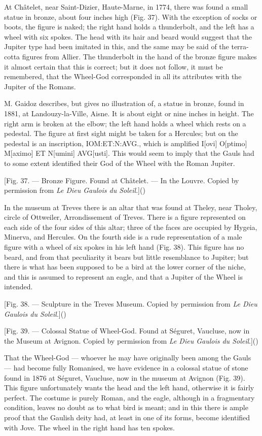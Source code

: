 \documentclass[a4paper, 11pt, oneside, polutonikogreek, english]{article}
\begin{document}
At Châtelet, near Saint-Dizier, Haute-Marne, in 1774, there was found a small statue in bronze, about four inches high (Fig. 37). With the exception of socks or boots, the figure is naked; the right hand holds a thunderbolt, and the left has a wheel with six spokes. The head with its hair and beard would suggest that the Jupiter type had been imitated in this, and the same may be said of the terra-cotta figures from Allier. The thunderbolt in the hand of the bronze figure makes it almost certain that this is correct; but it does not follow, it must be remembered, that the Wheel-God corresponded in all its attributes with the Jupiter of the Romans.

M. Gaidoz describes, but gives no illustration of, a statue in bronze, found in 1881, at Landouzy-la-Ville, Aisne. It is about eight or nine inches in height. The right arm is broken at the elbow; the left hand holds a wheel which rests on a pedestal. The figure at first sight might be taken for a Hercules; but on the pedestal is an inscription, IOM:ET:N:AVG., which is amplified I[ovi] O[ptimo] M[aximo] ET N[umini] AVG[usti]. This would seem to imply that the Gauls had to some extent identified their God of the Wheel with the Roman Jupiter.

[Fig. 37. --- Bronze Figure. Found at Châtelet. --- In the Louvre. Copied by permission from \emph{Le Dieu Gaulois du Soleil}.]()

In the museum at Treves there is an altar that was found at Theley, near Tholey, circle of Ottweiler, Arrondissement of Treves. There is a figure represented on each side of the four sides of this altar; three of the faces are occupied by Hygeia, Minerva, and Hercules. On the fourth side is a rude representation of a male figure with a wheel of six spokes in his left hand (Fig. 38). This figure has no beard, and from that peculiarity it bears but little resemblance to Jupiter; but there is what has been supposed to be a bird at the lower corner of the niche, and this is assumed to represent an eagle, and that a Jupiter of the Wheel is intended.

[Fig. 38. --- Sculpture in the Treves Museum. Copied by permission from \emph{Le Dieu Gaulois du Soleil}.]()

[Fig. 39. --- Colossal Statue of Wheel-God. Found at Séguret, Vaucluse, now in the Museum at Avignon. Copied by permission from \emph{Le Dieu Gaulois du Soleil}.]()

That the Wheel-God --- whoever he may have originally been among the Gauls --- had become fully Romanised, we have evidence in a colossal statue of stone found in 1876 at Séguret, Vaucluse, now in the museum at Avignon (Fig. 39). This figure unfortunately wants the head and the left hand, otherwise it is fairly perfect. The costume is purely Roman, and the eagle, although in a fragmentary condition, leaves no doubt as to what bird is meant; and in this there is ample proof that the Gaulish deity had, at least in one of its forms, become identified with Jove. The wheel in the right hand has ten spokes.
\end{document}
